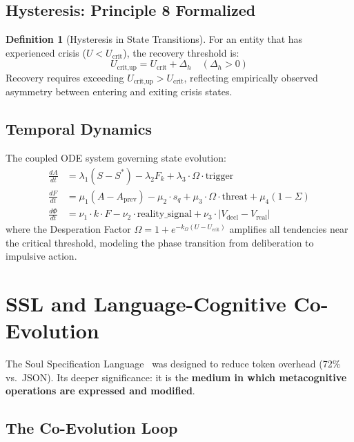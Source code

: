 \documentclass[12pt,a4paper]{article}
\theoremstyle{plain}
\theoremstyle{definition}
\newtheorem{definition}[theorem]{Definition}
\theoremstyle{remark}
\begin{document}
\subsection{Hysteresis: Principle 8 Formalized}

\begin{definition}[Hysteresis in State Transitions]
For an entity that has experienced crisis ($U < U_{\text{crit}}$), the recovery threshold is:
\[
U_{\text{crit,up}} = U_{\text{crit}} + \Delta_h \quad (\Delta_h > 0)
\]
Recovery requires exceeding $U_{\text{crit,up}} > U_{\text{crit}}$, reflecting empirically observed asymmetry between entering and exiting crisis states.
\end{definition}

\subsection{Temporal Dynamics}

The coupled ODE system governing state evolution:
\begin{align}
\frac{dA}{dt} &= \lambda_1(S - S^*) - \lambda_2 F_k + \lambda_3 \cdot \Omega \cdot \text{trigger} \\
\frac{dF}{dt} &= \mu_1(A - A_{\text{prev}}) - \mu_2 \cdot s_q + \mu_3 \cdot \Omega \cdot \text{threat} + \mu_4(1 - \Sigma) \\
\frac{d\Phi}{dt} &= \nu_1 \cdot k \cdot F - \nu_2 \cdot \text{reality\_signal} + \nu_3 \cdot |V_{\text{decl}} - V_{\text{real}}|
\end{align}
where the Desperation Factor $\Omega = 1 + e^{-k_\Omega(U - U_{\text{crit}})}$ amplifies all tendencies near the critical threshold, modeling the phase transition from deliberation to impulsive action.

\section{SSL and Language-Cognitive Co-Evolution}
\label{sec:ssl}

The Soul Specification Language~\cite{galmanus2026e} was designed to reduce token overhead (72\% vs.\ JSON). Its deeper significance: it is the \textbf{medium in which metacognitive operations are expressed and modified}.

\subsection{The Co-Evolution Loop}
\end{document}
